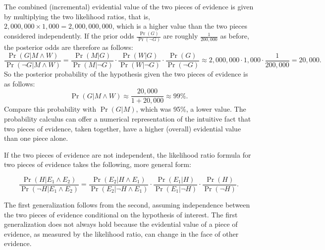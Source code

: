 \documentclass[10pt]{article}
\begin{document}
The combined (incremental) evidential value of the two pieces of evidence is given by multiplying the two likelihood 
ratios, that is, $2,000,000\times 1,000=2,000,000,000$, which is a higher value 
than the two pieces considered independently. 
If the prior odds $\frac{\Pr(G)}{\Pr(\neg G)}$ are roughly $\frac{1}{200,000}$
as before, the posterior odds are therefore as follows:
%
\[\frac{\Pr(G|M\wedge W)}{\Pr(\neg G|M\wedge W)}= \frac{\Pr(M |G)}{\Pr( M | \neg G)}\cdot \frac{\Pr(W |G)}{\Pr( W | \neg G)}\cdot \frac{\Pr(G)}{\Pr(\neg G)} \approx 2,000,000 \cdot 1,000 \cdot \frac{1}{200,000}= 20,000.\]
% 
So the posterior probability of the hypothesis given the two pieces of evidence is as follows:
%
\[\Pr(G|M\wedge W) \approx \frac{20,000}{1+20,000}\approx 99\%.\]
%
Compare this probability with $\Pr(G|M)$, which 
was 95\%, a lower value. The probability calculus can offer a numerical 
representation of the intuitive fact that two pieces of evidence, taken together, 
have a higher (overall) evidential value than one piece alone. 

 If the two pieces of evidence are not independent, 
the likelihood ratio formula for two pieces of evidence 
takes the following, more general 
form:

	\[ \frac{\Pr(H|E_1 \land E_2)}{\Pr(\neg H | E_1 \land E_2)} = 
	\frac{\Pr(E_2 | H \land E_1)}{\Pr(E_2| \neg H \land E_1)}
	\cdot 
	\frac{\Pr(E_1 | H)}{\Pr(E_1| \neg H)}
	\cdot 
	\frac{\Pr(H)}{\Pr(\neg H)}.\]

\noindent The first generalization follows from the second, assuming 
independence between the two pieces of evidence conditional on the hypothesis of interest. 
The first generalization does not always hold because 
the evidential value of a piece of evidence, as measured by the likelihood ratio, 
can change in the face of other evidence. 







\end{document}
